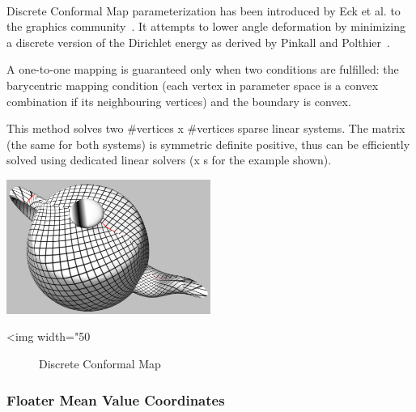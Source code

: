   \\

Discrete Conformal Map parameterization has been introduced by Eck et
al. to the graphics community~\cite{cgal:fh-survey-05}. It attempts to
lower angle deformation by minimizing a discrete version of the
Dirichlet energy as derived by Pinkall and
Polthier~\cite{cgal:fh-survey-05}.


A one-to-one mapping is guaranteed only when two conditions are
fulfilled: the barycentric mapping condition (each vertex in parameter
space is a convex combination if its neighbouring vertices) and the
boundary is convex.


This method solves two \#vertices x \#vertices sparse linear
systems. The matrix (the same for both systems) is symmetric definite
positive, thus can be efficiently solved using dedicated linear
solvers (x s for the example shown).

\begin{center}
    \label{parameterization-fig-conformal}
    \begin{ccTexOnly}
        \includegraphics[width=0.5\textwidth]{Parameterization/conformal} %
    \end{ccTexOnly}
    \begin{ccHtmlOnly}
        <img width="50%
    \end{ccHtmlOnly}
    \begin{figure}[h]
        \caption{Discrete Conformal Map}
    \end{figure}
\end{center}


\subsubsection{Floater Mean Value Coordinates}


